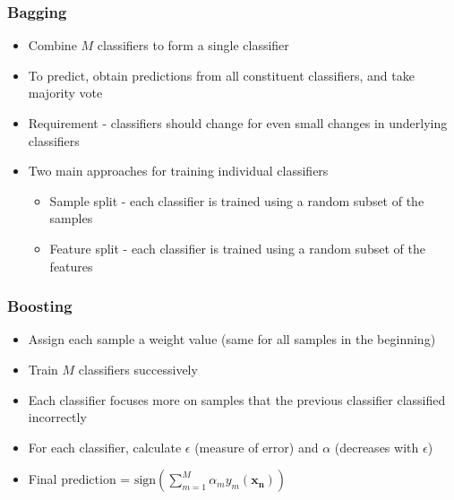 \documentclass{beamer}
\begin{document}
    \begin{frame}
        \frametitle{Bagging}
        \begin{itemize}
            \item{Combine $M$ classifiers to form a single classifier}
            \item{To predict, obtain predictions from all constituent classifiers, and take majority vote}
            \item{Requirement - classifiers should change for even small changes in underlying classifiers}
            \item{
            Two main approaches for training individual classifiers
            \begin{itemize}
                \item{Sample split - each classifier is trained using a random subset of the samples}
                \item{Feature split - each classifier is trained using a random subset of the features}
            \end{itemize}
            }
        \end{itemize}
    \end{frame}
    
    \begin{frame}
        \frametitle{Boosting}
        \begin{itemize}
            \item{Assign each sample a weight value (same for all samples in the beginning)}
            \item{Train $M$ classifiers successively}
            \item{Each classifier focuses more on samples that the previous classifier classified incorrectly}
            \item{For each classifier, calculate $\epsilon$ (measure of error) and $\alpha$ (decreases with $\epsilon$)}
            \item{Final prediction = $\mathrm{sign}(\displaystyle \sum_{m = 1}^{M} \alpha_m y_m(\mathbf{x_n}))$}
        \end{itemize}
    \end{frame}
    
\end{document}
